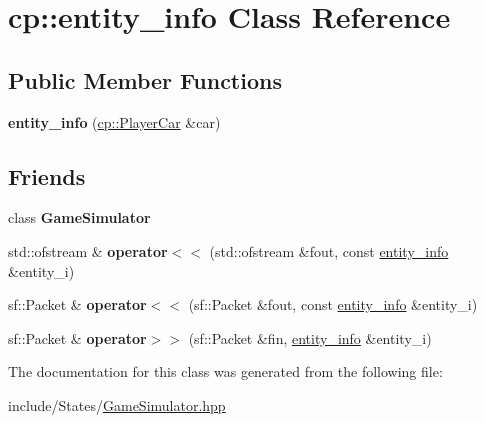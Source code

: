 \hypertarget{classcp_1_1entity__info}{}\section{cp\+:\+:entity\+\_\+info Class Reference}
\label{classcp_1_1entity__info}
\subsection*{Public Member Functions}
\begin{DoxyCompactItemize}
\item 
\mbox{\label{classcp_1_1entity__info_a6c2b40ed8186772e704d4450681423ee}} 
{\bfseries entity\+\_\+info} (\hyperlink{classcp_1_1_player_car}{cp\+::\+Player\+Car} \&car)
\end{DoxyCompactItemize}
\subsection*{Friends}
\begin{DoxyCompactItemize}
\item 
\mbox{\label{classcp_1_1entity__info_a5914b299fccea3f3c5ae2224cd4e2b3e}} 
class {\bfseries Game\+Simulator}
\item 
\mbox{\label{classcp_1_1entity__info_a64f8eecccbf7fd64b91d6b9c08c44c3e}} 
std\+::ofstream \& {\bfseries operator$<$$<$} (std\+::ofstream \&fout, const \hyperlink{classcp_1_1entity__info}{entity\+\_\+info} \&entity\+\_\+i)
\item 
\mbox{\label{classcp_1_1entity__info_aa2ff1395cb67fc5d9016f5d1cb3019fe}} 
sf\+::\+Packet \& {\bfseries operator$<$$<$} (sf\+::\+Packet \&fout, const \hyperlink{classcp_1_1entity__info}{entity\+\_\+info} \&entity\+\_\+i)
\item 
\mbox{\label{classcp_1_1entity__info_a7fbbc9d456cf16707aa9ad5839d87f15}} 
sf\+::\+Packet \& {\bfseries operator$>$$>$} (sf\+::\+Packet \&fin, \hyperlink{classcp_1_1entity__info}{entity\+\_\+info} \&entity\+\_\+i)
\end{DoxyCompactItemize}


The documentation for this class was generated from the following file\+:\begin{DoxyCompactItemize}
\item 
include/\+States/\hyperlink{_game_simulator_8hpp}{Game\+Simulator.\+hpp}\end{DoxyCompactItemize}

